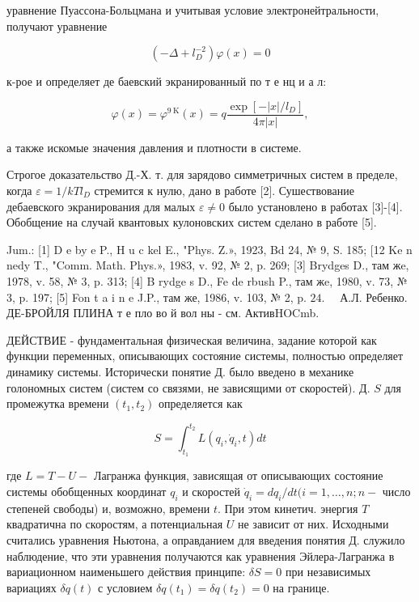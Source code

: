 \documentclass[10pt]{article}
\begin{document}
уравнение Пуассона-Больцмана и учитывая условие электронейтральности, получают уравнение



\[

\left(-\Delta+l_{D}^{-2}\right) \varphi(x)=0

\]



к-рое и определяет де баевский экранированный по т е нц и а л:



\[

\varphi(x)=\varphi^{9 \mathrm{~K}}(x)=q \frac{\exp \left[-|x| / l_{D}\right]}{4 \pi|x|},

\]



а также искомые значения давления и плотности в системе.



Строгое доказательство Д.-Х. т. для зарядово симметричных систем в пределе, когда $\varepsilon=1 / k T l_{D}$ стремится к нулю, дано в работе [2]. Сушествование дебаевского экранирования для малых $\varepsilon \neq 0$ было установлено в работах [3]-[4]. Обобщение на случай квантовых кулоновских систем сделано в работе [5].



Jum.: [1] D e by e P., H u c kel E., "Phys. Z.», 1923, Bd 24, № 9, S. 185; [12 Ke n nedy T., "Comm. Math. Phys.», 1983, v. 92, № 2, p. 269; [3] Brydges D., там жe, 1978, v. 58, № 3, p. 313; [4] B rydge s D., Fe de rbush P., там жe, 1980, v. 73, № 3, p. 197; [5] Fon t a i n e J.P., там же, 1986, v. 103, № 2, p. $24 . \quad$ А.Л. Ребенко. ДЕ-БРОЙЛЯ ПЛИНА т е пло во й вол ны - см. АктивHOCmb.



ДЕЙСТВИЕ - фундаментальная физическая величина, задание которой как функции переменных, описывающих состояние системы, полностью определяет динамику системы. Исторически понятие Д. было введено в механике голономных систем (систем со связями, не зависящими от скоростей). Д. $S$ для промежутка времени $\left(t_{1}, t_{2}\right)$ определяется как



\[

S=\int_{t_{1}}^{t_{2}} L\left(q_{i}, \dot{q}_{i}, t\right) d t

\]



где $L=T-U-$ Лагранжа функция, зависящая от описывающих состояние системы обобщенных координат $q_{i}$ и скоростей $\dot{q}_{i}=d q_{i} / d t(i=1, \ldots, n ; n-$ число степеней свободы) и, возможно, времени $t$. При этом кинетич. энергия $T$ квадратична по скоростям, а потенциальная $U$ не зависит от них. Исходными считались уравнения Ньютона, а оправданием для введения понятия Д. служило наблюдение, что эти уравнения получаются как уравнения Эйлера-Лагранжа в вариационном наименьшего действия принципе: $\delta S=0$ при независимых вариациях $\delta q(t)$ с условием $\delta q\left(t_{1}\right)=\delta q\left(t_{2}\right)=0$ на границе.
\end{document}
